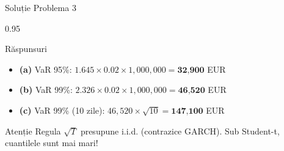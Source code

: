\documentclass[9pt, aspectratio=169, t]{beamer}
\begin{document}
\begin{frame}{Soluție Problema 3}
    \begin{cminipage}{0.95\textwidth}
    {\footnotesize
    \begin{exampleblock}{Răspunsuri}
        \begin{itemize}\setlength{\itemsep}{0pt}
            \item \textbf{(a)} VaR 95\%: $1.645 \times 0.02 \times 1{,}000{,}000 = \textbf{32{,}900}$ EUR
            \item \textbf{(b)} VaR 99\%: $2.326 \times 0.02 \times 1{,}000{,}000 = \textbf{46{,}520}$ EUR
            \item \textbf{(c)} VaR 99\% (10 zile): $46{,}520 \times \sqrt{10} = \textbf{147{,}100}$ EUR
        \end{itemize}
    \end{exampleblock}
    }
    \begin{alertblock}{Atenție}
        {\footnotesize Regula $\sqrt{T}$ presupune i.i.d. (contrazice GARCH). Sub Student-t, cuantilele sunt mai mari!}
    \end{alertblock}
    \end{cminipage}
\end{frame}
\end{document}
